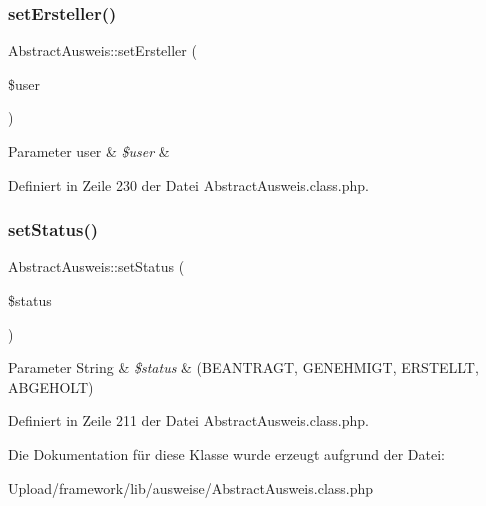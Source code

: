 \subsubsection{\texorpdfstring{set\+Ersteller()}{setErsteller()}}
{\footnotesize\ttfamily Abstract\+Ausweis\+::set\+Ersteller (\begin{DoxyParamCaption}\item[{}]{\$user }\end{DoxyParamCaption})}


\begin{DoxyParams}[1]{Parameter}
user & {\em \$user} & \\
\hline
\end{DoxyParams}


Definiert in Zeile 230 der Datei Abstract\+Ausweis.\+class.\+php.

\mbox{\label{class_abstract_ausweis_a361fa87f9b9b47c4e9985e80857e8b49}} 
\subsubsection{\texorpdfstring{set\+Status()}{setStatus()}}
{\footnotesize\ttfamily Abstract\+Ausweis\+::set\+Status (\begin{DoxyParamCaption}\item[{}]{\$status }\end{DoxyParamCaption})}


\begin{DoxyParams}[1]{Parameter}
String & {\em \$status} & (B\+E\+A\+N\+T\+R\+A\+GT, G\+E\+N\+E\+H\+M\+I\+GT, E\+R\+S\+T\+E\+L\+LT, A\+B\+G\+E\+H\+O\+LT) \\
\hline
\end{DoxyParams}


Definiert in Zeile 211 der Datei Abstract\+Ausweis.\+class.\+php.



Die Dokumentation für diese Klasse wurde erzeugt aufgrund der Datei\+:\begin{DoxyCompactItemize}
\item 
Upload/framework/lib/ausweise/Abstract\+Ausweis.\+class.\+php\end{DoxyCompactItemize}
